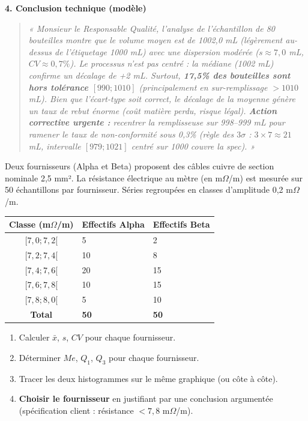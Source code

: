 \documentclass[11pt]{article}
\begin{document}
\begin{exoresolu}
\textbf{4. Conclusion technique (modèle)}
\begin{quote}
\emph{« Monsieur le Responsable Qualité, l'analyse de l'échantillon de 80 bouteilles montre que le volume moyen est de 1002,0 mL (légèrement au-dessus de l'étiquetage 1000 mL) avec une dispersion modérée ($s \approx 7,0$ mL, $CV \approx 0,7\%$). Le processus n'est pas centré : la médiane (1002 mL) confirme un décalage de +2 mL. Surtout, \textbf{17,5\% des bouteilles sont hors tolérance $[990;1010]$} (principalement en sur-remplissage $>1010$ mL). Bien que l'écart-type soit correct, le décalage de la moyenne génère un taux de rebut énorme (coût matière perdu, risque légal). \textbf{Action corrective urgente :} recentrer la remplisseuse sur 998--999 mL pour ramener le taux de non-conformité sous 0,3\% (règle des $3\sigma$ : $3 \times 7 \approx 21$ mL, intervalle $[979; 1021]$ centré sur 1000 couvre la spec). »}
\end{quote}
\end{exoresolu}

\begin{exercice}
Deux fournisseurs (Alpha et Beta) proposent des câbles cuivre de section nominale 2,5 mm². La résistance électrique au mètre (en m$\Omega$/m) est mesurée sur 50 échantillons par fournisseur. Séries regroupées en classes d'amplitude 0,2 m$\Omega$/m.

\begin{center}
\begin{tabularx}{\linewidth}{|c|X|X|}\hline
\rowcolor{popblueL}
\textbf{Classe (m$\Omega$/m)} & \textbf{Effectifs Alpha} & \textbf{Effectifs Beta} \\ \hline
$[7,0; 7,2[$ & 5 & 2 \\
$[7,2; 7,4[$ & 10 & 8 \\
$[7,4; 7,6[$ & 20 & 15 \\
$[7,6; 7,8[$ & 10 & 15 \\
$[7,8; 8,0[$ & 5 & 10 \\ \hline
\textbf{Total} & \textbf{50} & \textbf{50} \\ \hline
\end{tabularx}
\end{center}
\begin{enumerate}
    \item Calculer $\bar{x}$, $s$, $CV$ pour chaque fournisseur.
    \item Déterminer $Me$, $Q_1$, $Q_3$ pour chaque fournisseur.
    \item Tracer les deux histogrammes sur le même graphique (ou côte à côte).
    \item \textbf{Choisir le fournisseur} en justifiant par une conclusion argumentée (spécification client : résistance $< 7,8$ m$\Omega$/m).
\end{enumerate}
\end{exercice}
\end{document}
